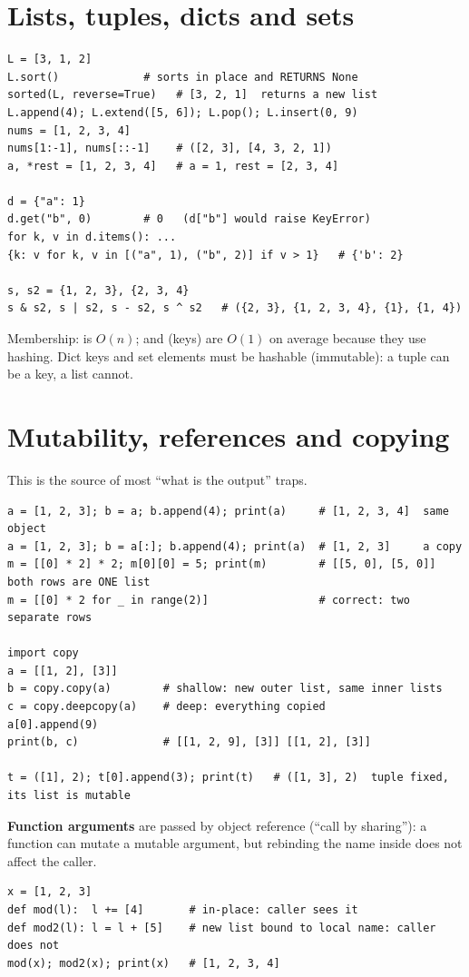 \section{Lists, tuples, dicts and sets}
\begin{lstlisting}
L = [3, 1, 2]
L.sort()             # sorts in place and RETURNS None
sorted(L, reverse=True)   # [3, 2, 1]  returns a new list
L.append(4); L.extend([5, 6]); L.pop(); L.insert(0, 9)
nums = [1, 2, 3, 4]
nums[1:-1], nums[::-1]    # ([2, 3], [4, 3, 2, 1])
a, *rest = [1, 2, 3, 4]   # a = 1, rest = [2, 3, 4]

d = {"a": 1}
d.get("b", 0)        # 0   (d["b"] would raise KeyError)
for k, v in d.items(): ...
{k: v for k, v in [("a", 1), ("b", 2)] if v > 1}   # {'b': 2}

s, s2 = {1, 2, 3}, {2, 3, 4}
s & s2, s | s2, s - s2, s ^ s2   # ({2, 3}, {1, 2, 3, 4}, {1}, {1, 4})
\end{lstlisting}
Membership:  is $O(n)$;  and  (keys) are $O(1)$ on average because they use hashing. Dict keys and set elements
must be hashable (immutable): a tuple can be a key, a list cannot.

\section{Mutability, references and copying}
This is the source of most ``what is the output'' traps.
\begin{lstlisting}
a = [1, 2, 3]; b = a; b.append(4); print(a)     # [1, 2, 3, 4]  same object
a = [1, 2, 3]; b = a[:]; b.append(4); print(a)  # [1, 2, 3]     a copy
m = [[0] * 2] * 2; m[0][0] = 5; print(m)        # [[5, 0], [5, 0]]  both rows are ONE list
m = [[0] * 2 for _ in range(2)]                 # correct: two separate rows

import copy
a = [[1, 2], [3]]
b = copy.copy(a)        # shallow: new outer list, same inner lists
c = copy.deepcopy(a)    # deep: everything copied
a[0].append(9)
print(b, c)             # [[1, 2, 9], [3]] [[1, 2], [3]]

t = ([1], 2); t[0].append(3); print(t)   # ([1, 3], 2)  tuple fixed, its list is mutable
\end{lstlisting}
\textbf{Function arguments} are passed by object reference (``call by sharing''): a function can mutate a mutable argument, but rebinding the name inside does not
affect the caller.
\begin{lstlisting}
x = [1, 2, 3]
def mod(l):  l += [4]       # in-place: caller sees it
def mod2(l): l = l + [5]    # new list bound to local name: caller does not
mod(x); mod2(x); print(x)   # [1, 2, 3, 4]
\end{lstlisting}

